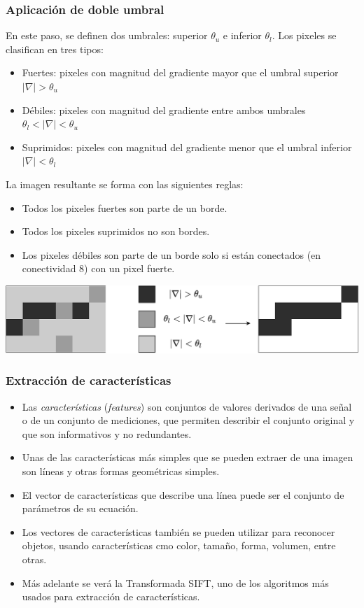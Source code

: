 \begin{frame}\frametitle{Aplicación de doble umbral}
  En este paso, se definen dos umbrales: superior $\theta_u$ e inferior $\theta_l$. Los pixeles se clasifican en tres tipos:
  \begin{itemize}
  \item Fuertes: pixeles con magnitud del gradiente mayor que el umbral superior $|\nabla | > \theta_u$
  \item Débiles: pixeles con magnitud del gradiente entre ambos umbrales $\theta_l < |\nabla| < \theta_u$
  \item Suprimidos: pixeles con magnitud del gradiente menor que el umbral inferior $|\nabla| < \theta_l$
  \end{itemize}
  La imagen resultante se forma con las siguientes reglas:
  \begin{itemize}
  \item Todos los pixeles fuertes son parte de un borde.
  \item Todos los pixeles suprimidos no son bordes. 
  \item Los pixeles débiles son parte de un borde solo si están conectados (en conectividad 8) con un pixel fuerte.
  \end{itemize}
  \includegraphics[width=\textwidth]{Figures/CannyDoubleThreshold.pdf}
\end{frame}

\begin{frame}\frametitle{Extracción de características}
  \begin{itemize}
  \item Las \textit{características} (\textit{features}) son conjuntos de valores derivados de una señal o de un conjunto de mediciones, que permiten describir el conjunto original y que son informativos y no redundantes.
  \item   Unas de las características más simples que se pueden extraer de una imagen son líneas y otras formas geométricas simples.
  \item El vector de características que describe una línea puede ser el conjunto de parámetros de su ecuación.
  \item Los vectores de características también se pueden utilizar para reconocer objetos, usando características cmo color, tamaño, forma, volumen, entre otras.
   \item Más adelante se verá la Transformada SIFT, uno de los algoritmos más usados para extracción de características. 
  \end{itemize}
\end{frame}

